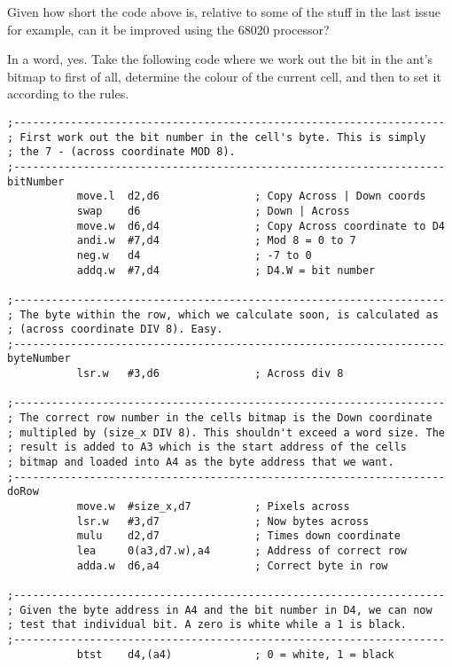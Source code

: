 Given how short the code above is, relative to some of the stuff in the last issue for example, can it be improved using the 68020 processor?

In a word, yes. Take the following code where we work out the bit in the ant's bitmap to first of all, determine the colour of the current cell, and then to set it according to the rules.

\begin{lstlisting}[firstnumber=255,caption={Langtons Ant - A 68020 Improvement}]
;--------------------------------------------------------------------
; First work out the bit number in the cell's byte. This is simply
; the 7 - (across coordinate MOD 8).
;--------------------------------------------------------------------
bitNumber
           move.l  d2,d6               ; Copy Across | Down coords
           swap    d6                  ; Down | Across
           move.w  d6,d4               ; Copy Across coordinate to D4
           andi.w  #7,d4               ; Mod 8 = 0 to 7
           neg.w   d4                  ; -7 to 0
           addq.w  #7,d4               ; D4.W = bit number

;--------------------------------------------------------------------
; The byte within the row, which we calculate soon, is calculated as
; (across coordinate DIV 8). Easy.
;--------------------------------------------------------------------
byteNumber
           lsr.w   #3,d6               ; Across div 8

;--------------------------------------------------------------------
; The correct row number in the cells bitmap is the Down coordinate
; multipled by (size_x DIV 8). This shouldn't exceed a word size. The
; result is added to A3 which is the start address of the cells
; bitmap and loaded into A4 as the byte address that we want.
;--------------------------------------------------------------------
doRow
           move.w  #size_x,d7          ; Pixels across
           lsr.w   #3,d7               ; Now bytes across
           mulu    d2,d7               ; Times down coordinate
           lea     0(a3,d7.w),a4       ; Address of correct row
           adda.w  d6,a4               ; Correct byte in row

;--------------------------------------------------------------------
; Given the byte address in A4 and the bit number in D4, we can now
; test that individual bit. A zero is white while a 1 is black.
;--------------------------------------------------------------------
           btst    d4,(a4)             ; 0 = white, 1 = black
\end{lstlisting}

